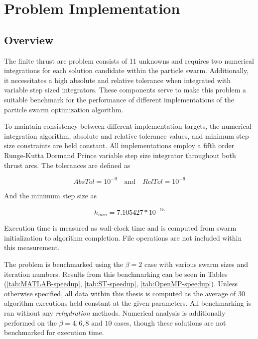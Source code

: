 \chapter{Problem Implementation}
\section{Overview}
\noindent The finite thrust arc problem consists of 11 unknowns and requires two numerical integrations for each solution candidate within the
particle swarm. Additionally, it necessitates a high absolute and relative tolerance when integrated with variable step sized integrators. These
components serve to make this problem a suitable benchmark for the performance of different implementations of the particle swarm optimization algorithm. \newline

\noindent To maintain consistency between different implementation targets, the numerical integration algorithm, absolute and relative tolerance values,
and minimum step size constraints are held constant. All implementations employ a fifth order Runge-Kutta Dormand Prince variable step size integrator
throughout both thrust arcs. The tolerances are defined as

\begin{equation}
AbsTol = 10^{-9} \quad \text{and} \quad RelTol = 10^{-9} 
\label{eq:tolerances}
\end{equation}

\noindent And the minimum step size as

\begin{equation}
    h_{min} = 7.105427*10^{-15}
    \label{eq:min-step-size}
\end{equation}

\noindent Execution time is measured as wall-clock time and is computed from swarm initialization 
to algorithm completion. File operations are not included within this measurement. \newline

\noindent The problem is benchmarked using the $\beta = 2$ case with various swarm sizes and iteration numbers. 
Results from this benchmarking can be seen in Tables (\ref{tab:MATLAB-speedup}, \ref{tab:ST-speedup}, \ref{tab:OpenMP-speedup}). Unless otherwise 
specified, all data within this thesis is computed as the average of 30 algorithm executions held constant at the given parameters. 
All benchmarking is ran without any \textit{rehydration} methods.
Numerical analysis is additionally performed on the $\beta=4,6,8 \text{ and } 10$ cases, though these solutions are not benchmarked for execution time.

